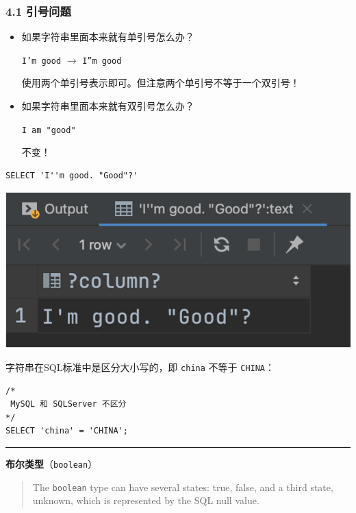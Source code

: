 \documentclass[aspectratio=169, 14pt]{beamer}
\begin{document}
\begin{frame}
    \frametitle{4.1 引号问题}
\begin{itemize}
    \item<1-> 如果字符串里面本来就有单引号怎么办？
    
    \texttt{I'm good} $\rightarrow$ \texttt{I''m good}

    使用两个单引号表示即可。但注意\alert{两个单引号不等于一个双引号}！
    \item<2-> 如果字符串里面本来就有双引号怎么办？
    
    \texttt{I am "good"}

    不变！
\end{itemize}
    
\end{frame}

\begin{frame}[fragile]
    \begin{verbatim} 
SELECT 'I''m good. "Good"?'
    \end{verbatim}

    \includegraphics[height=.6\paperheight]{week4/good}    
\end{frame}

\begin{frame}[fragile]
    字符串在SQL标准中是区分大小写的，即 \texttt{china} 不等于 \texttt{CHINA}：
\begin{verbatim} 
/*
 MySQL 和 SQLServer 不区分
*/
SELECT 'china' = 'CHINA';
\end{verbatim}
    \pause
\noindent\rule{\textwidth}{1pt}
\textbf{布尔类型}（\texttt{boolean}）
\begin{quote}
    The \texttt{boolean} type can have several states: \alert{true}, \alert{false}, and a third state, \alert{unknown}, which is represented by the SQL \alert{null} value.
\end{quote}

\end{frame}
\end{document}
